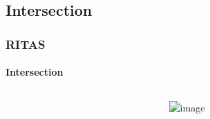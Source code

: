 \documentclass{beamer}
\begin{document}
\begin{frame}
\begin{columns}[T]
\begin{column}{0.70\textwidth}
\begin{center}
      \end{center}
    \end{column}
  \end{columns}
\end{frame}


\subsection{Intersection}

\begin{frame}
  \frametitle{RITAS}
  \framesubtitle{Intersection}

  \fontsize{6pt}{7.2}\selectfont 
  \begin{columns}[T]
    \begin{column}{0.30\textwidth}

    \end{column}
    
    \begin{column}{0.70\textwidth}
      \begin{center}
        \includegraphics<1->[width=0.95\textwidth]{./figures/intro_intersection}
      \end{center}
    \end{column}
  \end{columns}
\end{frame}
\end{document}
